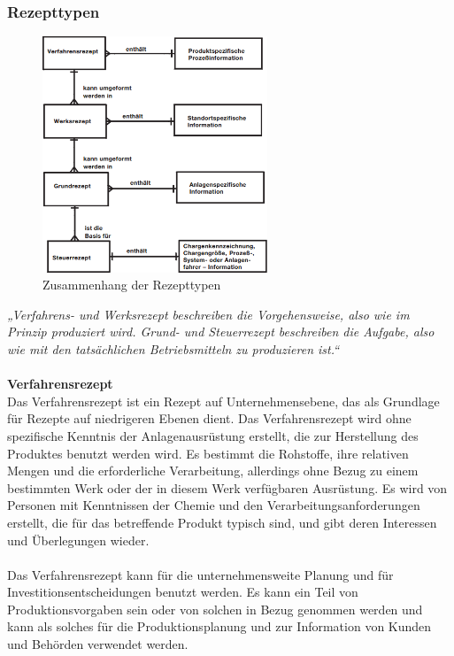 \subsubsection{Rezepttypen}
\begin{figure}[h!]
		\centering
		\includegraphics[width=0.6\textwidth]{graphics/stateoftheart/rezepttypen.png}
		\caption{Zusammenhang der Rezepttypen}
\end{figure}
\textit{„Verfahrens- und Werksrezept beschreiben die Vorgehensweise, also wie im Prinzip produziert wird. Grund- und Steuerrezept beschreiben die Aufgabe, also wie mit den tatsächlichen Betriebsmitteln zu produzieren ist.“} 
\\\\
\textbf{Verfahrensrezept}\\
Das Verfahrensrezept ist ein Rezept auf Unternehmensebene, das als Grundlage für Rezepte auf niedrigeren Ebenen dient. Das Verfahrensrezept wird ohne spezifische Kenntnis der Anlagenausrüstung erstellt, die zur Herstellung des Produktes benutzt werden wird. Es bestimmt die Rohstoffe, ihre relativen Mengen und die erforderliche Verarbeitung, allerdings ohne Bezug zu einem bestimmten Werk oder der in diesem Werk verfügbaren Ausrüstung. Es wird von Personen mit Kenntnissen der Chemie und den Verarbeitungsanforderungen erstellt, die für das betreffende Produkt typisch sind, und gibt deren Interessen und Überlegungen wieder.\\\\
Das Verfahrensrezept kann für die unternehmensweite Planung und für Investitionsentscheidungen benutzt werden. Es kann ein Teil von Produktionsvorgaben sein oder von solchen in Bezug genommen werden und kann als solches für die Produktionsplanung und zur Information von Kunden und Behörden verwendet werden.
